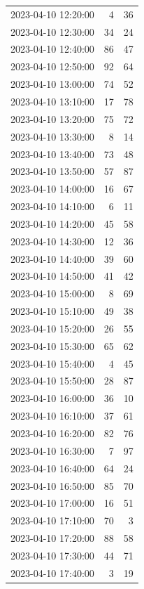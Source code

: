 \documentclass[
  letterpaper,
  DIV=11,
  numbers=noendperiod]{scrartcl}
\begin{document}
\begin{tabular}{lrr}
2023-04-10 12:20:00 &     4 &    36 \\
2023-04-10 12:30:00 &    34 &    24 \\
2023-04-10 12:40:00 &    86 &    47 \\
2023-04-10 12:50:00 &    92 &    64 \\
2023-04-10 13:00:00 &    74 &    52 \\
2023-04-10 13:10:00 &    17 &    78 \\
2023-04-10 13:20:00 &    75 &    72 \\
2023-04-10 13:30:00 &     8 &    14 \\
2023-04-10 13:40:00 &    73 &    48 \\
2023-04-10 13:50:00 &    57 &    87 \\
2023-04-10 14:00:00 &    16 &    67 \\
2023-04-10 14:10:00 &     6 &    11 \\
2023-04-10 14:20:00 &    45 &    58 \\
2023-04-10 14:30:00 &    12 &    36 \\
2023-04-10 14:40:00 &    39 &    60 \\
2023-04-10 14:50:00 &    41 &    42 \\
2023-04-10 15:00:00 &     8 &    69 \\
2023-04-10 15:10:00 &    49 &    38 \\
2023-04-10 15:20:00 &    26 &    55 \\
2023-04-10 15:30:00 &    65 &    62 \\
2023-04-10 15:40:00 &     4 &    45 \\
2023-04-10 15:50:00 &    28 &    87 \\
2023-04-10 16:00:00 &    36 &    10 \\
2023-04-10 16:10:00 &    37 &    61 \\
2023-04-10 16:20:00 &    82 &    76 \\
2023-04-10 16:30:00 &     7 &    97 \\
2023-04-10 16:40:00 &    64 &    24 \\
2023-04-10 16:50:00 &    85 &    70 \\
2023-04-10 17:00:00 &    16 &    51 \\
2023-04-10 17:10:00 &    70 &     3 \\
2023-04-10 17:20:00 &    88 &    58 \\
2023-04-10 17:30:00 &    44 &    71 \\
2023-04-10 17:40:00 &     3 &    19 \\

\end{tabular}
\end{document}
